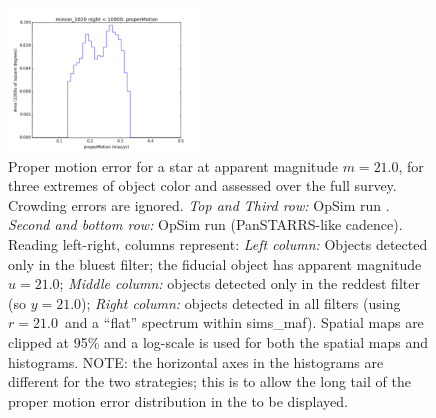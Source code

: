 \begin{figure}[ht]
\begin{center}
  \includegraphics[width=2.0in]{./figs/milkyway/astromPanels/MW_Astrom_pmError_PanSTARRS_10y_hst.png}
  \end{center}
  \caption{Proper motion error for a star at apparent magnitude $m=21.0$, for three extremes of object color and assessed over the full survey. Crowding errors are ignored. {\it Top and Third row:} OpSim run . {\it Second and bottom row:} OpSim run  (PanSTARRS-like cadence). Reading left-right, columns represent: {\it Left column:} Objects detected only in the bluest filter; the fiducial object has apparent magnitude $u=21.0$; {\it Middle column:} objects detected only in the reddest filter (so $y = 21.0$); {\it Right column:} objects detected in all filters (using $r=21.0$~and a ``flat'' spectrum within sims\_maf). Spatial maps are clipped at 95\% and a log-scale is used for both the spatial maps and histograms. NOTE: the horizontal axes in the histograms are different for the two strategies; this is to allow the long tail of the proper motion error distribution in the  to be displayed. }
  \label{fig_astrom_ByFilter_pmError}
\end{figure}

